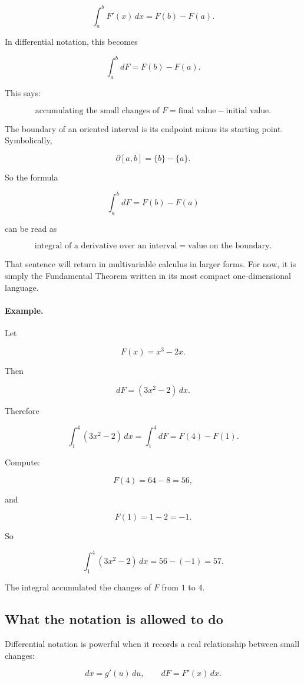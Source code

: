 \[
\int_a^b F'(x)\,dx=F(b)-F(a).
\]

In differential notation, this becomes

\[
\boxed{
\int_a^b dF=F(b)-F(a).
}
\]

This says:

\[
\text{accumulating the small changes of \(F\)}
=
\text{final value}-\text{initial value}.
\]

The boundary of an oriented interval is its endpoint minus its starting point.  Symbolically,

\[
\partial[a,b]=\{b\}-\{a\}.
\]

So the formula

\[
\int_a^b dF=F(b)-F(a)
\]

can be read as

\[
\text{integral of a derivative over an interval}
=
\text{value on the boundary}.
\]

That sentence will return in multivariable calculus in larger forms.  For now, it is simply
the Fundamental Theorem written in its most compact one-dimensional language.

\paragraph{Example.}
Let

\[
F(x)=x^3-2x.
\]

Then

\[
dF=(3x^2-2)\,dx.
\]

Therefore

\[
\int_1^4 (3x^2-2)\,dx
=
\int_1^4 dF
=
F(4)-F(1).
\]

Compute:

\[
F(4)=64-8=56,
\]

and

\[
F(1)=1-2=-1.
\]

So

\[
\int_1^4 (3x^2-2)\,dx=56-(-1)=57.
\]

The integral accumulated the changes of \(F\) from \(1\) to \(4\).

\subsection{What the notation is allowed to do}
\label{subsec:what-differential-notation-can-do}

Differential notation is powerful when it records a real relationship between small
changes:

\[
dx=g'(u)\,du,
\qquad
dF=F'(x)\,dx.
\]

